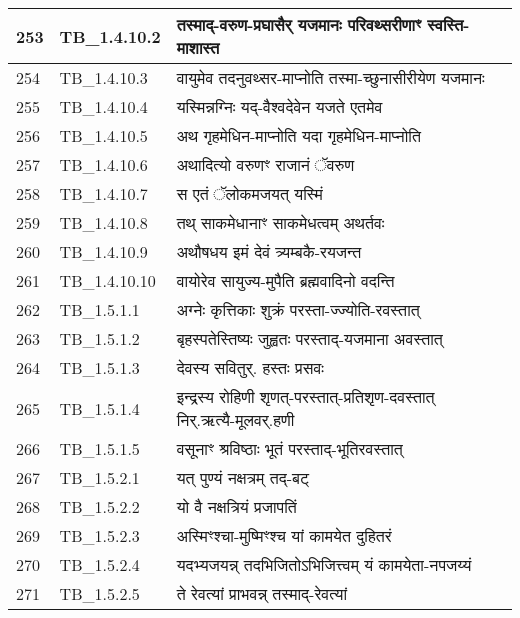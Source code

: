 \documentclass[17pt]{extarticle}
\begin{document}
\begin{longtable}{||p{0.4in}||p{0.9in}||p{4.0in}||p{0.9in}||}
        \hline
            253 & TB\_1.4.10.2 & तस्माद्{-}वरुण{-}प्रघासैर् यजमानः परिवथ्सरीणाꣳ स्वस्ति{-}माशास्त &      \\
        \hline
            254 & TB\_1.4.10.3 & वायुमेव तदनुवथ्सर{-}माप्नोति तस्मा{-}च्छुनासीरीयेण यजमानः &      \\
        \hline
            255 & TB\_1.4.10.4 & यस्मिन्नग्निः यद्{-}वैश्वदेवेन यजते एतमेव &      \\
        \hline
            256 & TB\_1.4.10.5 & अथ गृहमेधिन{-}माप्नोति यदा गृहमेधिन{-}माप्नोति &      \\
        \hline
            257 & TB\_1.4.10.6 & अथादित्यो वरुणꣳ राजानं ॅवरुण &      \\
        \hline
            258 & TB\_1.4.10.7 & स एतं ॅलोकमजयत् यस्मिं &      \\
        \hline
            259 & TB\_1.4.10.8 & तथ् साकमेधानाꣳ साकमेधत्वम् अथर्तवः &      \\
        \hline
            260 & TB\_1.4.10.9 & अथौषधय इमं देवं त्र्यम्बकै{-}रयजन्त &      \\
        \hline
            261 & TB\_1.4.10.10 & वायोरेव सायुज्य{-}मुपैति ब्रह्मवादिनो वदन्ति &      \\
        \hline
            262 & TB\_1.5.1.1 & अग्नेः कृत्तिकाः शुक्रं परस्ता{-}ज्ज्योति{-}रवस्तात् &      \\
        \hline
            263 & TB\_1.5.1.2 & बृहस्पतेस्तिष्यः जुह्वतः परस्ताद्{-}यजमाना अवस्तात् &      \\
        \hline
            264 & TB\_1.5.1.3 & देवस्य सवितुर्. हस्तः प्रसवः &      \\
        \hline
            265 & TB\_1.5.1.4 & इन्द्रस्य रोहिणी शृणत्{-}परस्तात्{-}प्रतिशृण{-}दवस्तात् निर्.ऋत्यै{-}मूलवर्.हणी &      \\
        \hline
            266 & TB\_1.5.1.5 & वसूनाꣳ श्रविष्ठाः भूतं परस्ताद्{-}भूतिरवस्तात् &      \\
        \hline
            267 & TB\_1.5.2.1 & यत् पुण्यं नक्षत्रम् तद्{-}बट् &      \\
        \hline
            268 & TB\_1.5.2.2 & यो वै नक्षत्रियं प्रजापतिं &      \\
        \hline
            269 & TB\_1.5.2.3 & अस्मिꣳश्चा{-}मुष्मिꣳश्च यां कामयेत दुहितरं &      \\
        \hline
            270 & TB\_1.5.2.4 & यदभ्यजयन्न् तदभिजितोऽभिजित्त्वम् यं कामयेता{-}नपजय्यं &      \\
        \hline
            271 & TB\_1.5.2.5 & ते रेवत्यां प्राभवन्न् तस्माद्{-}रेवत्यां &      \\

\end{longtable}
\end{document}
